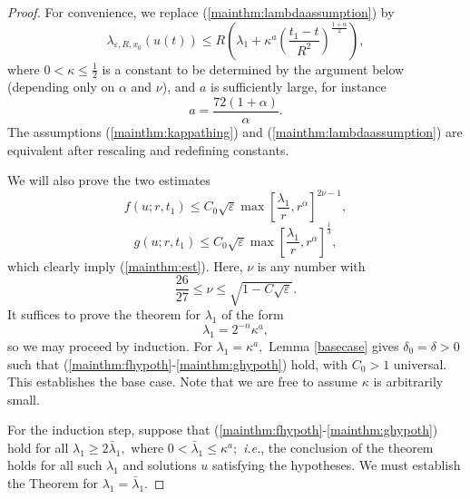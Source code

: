 \documentclass[12pt]{amsart}
\newcommand{\LB}{\left[}
\newcommand{\RB}{\right]}
\theoremstyle{others}
\numberwithin{equation}{section}
\newcommand{\eps}{\varepsilon}
\begin{document}
\begin{proof} %
For convenience, we replace (\ref{mainthm:lambdaassumption}) by
\begin{equation}\label{mainthm:kappathing}
\lambda_{\eps, R, x_0}(u(t)) \leq R \left( \lambda_1 + \kappa^{a} \left( \frac{t_1 - t}{R^2} \right)^{\frac{1 + \alpha}{2}} \right),
\end{equation}
where $0 < \kappa \leq \frac12$ is a constant %
to be determined by the argument below (depending only on $\alpha$ and $\nu$), and $a$ is sufficiently large, for instance
\begin{equation}\label{mainthm:athing}
a = \frac{72( 1 + \alpha) }{\alpha}.
\end{equation}
The assumptions (\ref{mainthm:kappathing}) and (\ref{mainthm:lambdaassumption}) are equivalent after rescaling and redefining constants. %

We will also prove the two estimates
\begin{equation}\label{mainthm:fhypoth}
 f(u;r,t_1) \leq C_0 \sqrt{\eps} \max \LB \frac{\lambda_1}{r}, r^{\alpha} \RB^{2 \nu - 1},
\end{equation}
\begin{equation}\label{mainthm:ghypoth}
g(u;r,t_1) \leq C_0 \sqrt{\eps} \max \LB \frac{\lambda_1}{r}, r^{\alpha} \RB^{\frac13},
\end{equation}
which clearly imply (\ref{mainthm:est}). Here, $\nu$ is any number with
\begin{equation}\label{mainthm:nucloseness}
\frac{26}{27} \leq \nu \leq \sqrt{1 - C \sqrt{\eps}} .
\end{equation}
It suffices to prove the theorem for $\lambda_1$ of the form
$$\lambda_1 = 2^{-n} \kappa^a,$$
so we may proceed by induction. For $\lambda_1 = \kappa^a,$
Lemma \ref{basecase} gives $\delta_0 = \delta > 0$ such that (\ref{mainthm:fhypoth}-\ref{mainthm:ghypoth}) hold, with $C_0 > 1$ universal. This establishes the base case. Note that we are free to assume $\kappa$ is arbitrarily small.


For the induction step, suppose that (\ref{mainthm:fhypoth}-\ref{mainthm:ghypoth}) hold for all $\lambda_1 \geq 2\bar{\lambda}_1,$ where $0 < \bar{\lambda}_1 \leq \kappa^a;$ {\it i.e.}, the conclusion of the theorem holds for all such $\lambda_1$ and solutions $u$ satisfying the hypotheses. We must establish the Theorem for $\lambda_1 = \bar{\lambda}_1.$


\end{proof}
\end{document}
